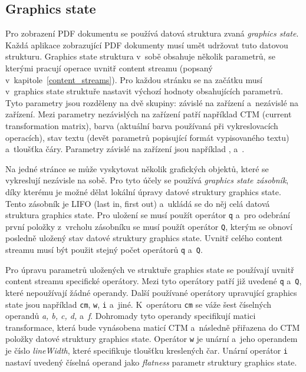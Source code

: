 \subsection*{Graphics state}
Pro zobrazení PDF dokumentu se používá datová struktura zvaná \emph{graphics state}.
Každá aplikace zobrazující PDF dokumenty musí umět udržovat tuto datovou strukturu.
Graphics state struktura v~sobě obsahuje několik parametrů, se kterými pracují
operace uvnitř content streamu (popsaný v~kapitole~\ref{content_streams}). Pro
každou stránku se na začátku musí v~graphics state struktuře nastavit výchozí
hodnoty obsahujících parametrů. Tyto parametry jsou rozděleny na dvě skupiny:
závislé na zařízení a~nezávislé na zařízení. Mezi parametry nezávislých na zařízení
patří například CTM (current transformation matrix), barva (aktuální barva
používaná při vykreslovacích operacích), stav textu (devět parametrů popisující
formát vypisovaného textu) a~tloušťka čáry. Parametry závislé na zařízení jsou
například ,  a~.

Na jedné stránce se může vyskytovat několik grafických objektů, které se
vykreslují nezávisle na sobě. Pro tyto účely se používá
\emph{graphics state zásobník}, díky kterému je možné dělat lokální úpravy 
datové struktury graphics state. Tento zásobník je LIFO (last in, first out)
a~ukládá se do něj celá datová struktura graphics state. Pro uložení
se musí použít operátor \texttt{q} a~pro odebrání první položky z~vrcholu
zásobníku se musí použít operátor \texttt{Q}, kterým se obnoví posledně uložený
stav datové struktury graphics state. Uvnitř celého content streamu musí být
použit stejný počet operátorů \texttt{q} a~\texttt{Q}.

Pro úpravu parametrů uložených ve struktuře graphics state se používají uvnitř
content streamu specifické operátory. Mezi tyto operátory patří již uvedené
\texttt{q} a~\texttt{Q}, které nepoužívají žádné operandy. Další používané
operátory upravující graphics state jsou například \texttt{cm}, \texttt{w},
\texttt{i} a~jiné. K~operátoru \texttt{cm} se váže šest číselných operandů
\emph{a, b, c, d,} a~\emph{f}. Dohromady tyto operandy specifikují matici
transformace, která bude vynásobena maticí CTM a~následně přiřazena do CTM položky
datové struktury graphics state. Operátor \texttt{w} je unární a~jeho operandem
je číslo \emph{lineWidth}, které specifikuje tloušťku kreslených čar. Unární
operátor \texttt{i} nastaví uvedený číselná operand jako \emph{flatness} parametr
struktury graphics state.



